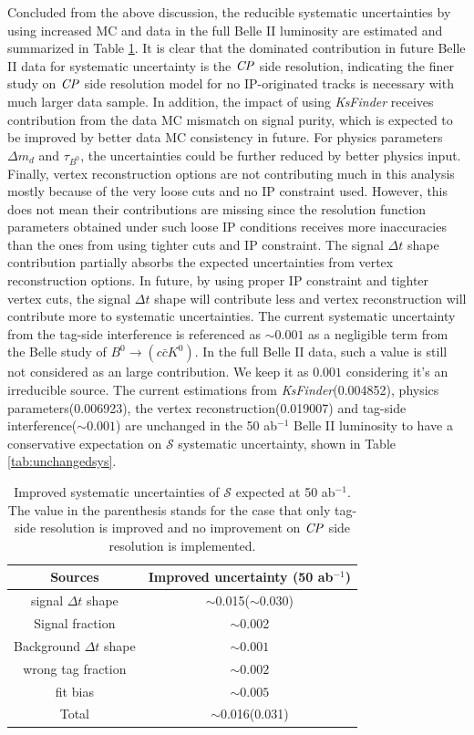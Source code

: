 Concluded from the above discussion, the reducible systematic uncertainties by using increased MC and data in the full Belle II luminosity are estimated and summarized in Table \ref{tab:reducedsys}. It is clear that the dominated contribution in future Belle II data for systematic uncertainty is the $\it{CP}$ side resolution, indicating the finer study on $\it{CP}$ side resolution model for no IP-originated tracks is necessary with much larger data sample.
In addition, the impact of using \textit{KsFinder} receives contribution from the data MC mismatch on signal purity, which is expected to be improved by better data MC consistency in future. For physics parameters $\Delta m_d$ and $\tau_{B^0}$, the uncertainties could be further reduced by better physics input. Finally, vertex reconstruction options are not contributing much in this analysis mostly because of the very loose cuts and no IP constraint used. However, this does not mean their contributions are missing since the resolution function parameters obtained under such loose IP conditions receives more inaccuracies than the ones from using tighter cuts and IP constraint. The signal $\Delta t$ shape contribution partially absorbs the expected uncertainties from vertex reconstruction options. In future, by using proper IP constraint and tighter vertex cuts, the signal $\Delta t$ shape will contribute less and vertex reconstruction will contribute more to systematic uncertainties.  The current systematic uncertainty from the tag-side interference is referenced as $\sim0.001$ as a negligible term from the Belle study of $B^0\to (c\bar{c}K^0)$\cite{yosuke2011measurement}. In the full Belle II data, such a value is still not considered as an large contribution. We keep it as $0.001$ considering it's an irreducible source. The current estimations from \textit{KsFinder}(0.004852), physics parameters(0.006923), the vertex reconstruction(0.019007) and tag-side interference($\sim0.001$) are unchanged in the 50 ab$^{-1}$ Belle II luminosity to have a conservative expectation on $\mathcal{S}$ systematic uncertainty, shown in Table \ref{tab:unchangedsys}.

 
\begin{table}[htpb]
	\centering
	\caption{ Improved systematic uncertainties of $\mathcal{S}$ expected at 50 ab$^{-1}$. The value in the parenthesis stands for the case that only tag-side resolution is improved and no improvement on $\it{CP}$ side resolution is implemented. }
	\label{tab:reducedsys}
	\begin{tabular}{c| c}
		\hline
		Sources & Improved uncertainty (50 ab$^{-1}$) \\
		\hline
		signal $\Delta t$ shape &  $\sim$0.015($\sim$0.030)\\
		Signal fraction &  $\sim$0.002 \\
		Background $\Delta t$ shape &  $\sim0.001$\\
		wrong tag fraction &  $\sim0.002$\\
		fit bias &  $\sim0.005$\\
		\hline
		Total & $\sim$0.016(0.031)\\
		\hline
	\end{tabular}
\end{table}

